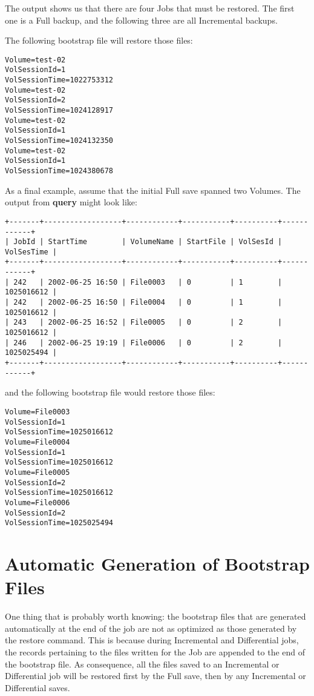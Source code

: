 The output shows us that there are four Jobs that must be restored. The first
one is a Full backup, and the following three are all Incremental backups.

The following bootstrap file will restore those files:

\footnotesize
\begin{verbatim}
Volume=test-02
VolSessionId=1
VolSessionTime=1022753312
Volume=test-02
VolSessionId=2
VolSessionTime=1024128917
Volume=test-02
VolSessionId=1
VolSessionTime=1024132350
Volume=test-02
VolSessionId=1
VolSessionTime=1024380678
\end{verbatim}
\normalsize

As a final example, assume that the initial Full save spanned two Volumes. The
output from {\bf query} might look like:

\footnotesize
\begin{verbatim}
+-------+------------------+------------+-----------+----------+------------+
| JobId | StartTime        | VolumeName | StartFile | VolSesId | VolSesTime |
+-------+------------------+------------+-----------+----------+------------+
| 242   | 2002-06-25 16:50 | File0003   | 0         | 1        | 1025016612 |
| 242   | 2002-06-25 16:50 | File0004   | 0         | 1        | 1025016612 |
| 243   | 2002-06-25 16:52 | File0005   | 0         | 2        | 1025016612 |
| 246   | 2002-06-25 19:19 | File0006   | 0         | 2        | 1025025494 |
+-------+------------------+------------+-----------+----------+------------+
\end{verbatim}
\normalsize

and the following bootstrap file would restore those files:

\footnotesize
\begin{verbatim}
Volume=File0003
VolSessionId=1
VolSessionTime=1025016612
Volume=File0004
VolSessionId=1
VolSessionTime=1025016612
Volume=File0005
VolSessionId=2
VolSessionTime=1025016612
Volume=File0006
VolSessionId=2
VolSessionTime=1025025494
\end{verbatim}
\normalsize

\section{Automatic Generation of Bootstrap Files}

One thing that is probably worth knowing: the bootstrap files that are
generated automatically at the end of the job are not as optimized as those
generated by the restore command. This is because during Incremental and
Differential jobs, the records pertaining to the files written for the
Job are appended to the end of the bootstrap file.
As consequence, all the files saved to an Incremental or Differential job will be
restored first by the Full save, then by any Incremental or Differential
saves.

